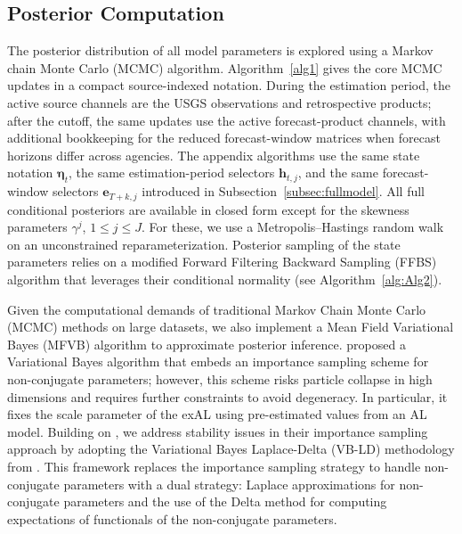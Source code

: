 \documentclass[APA,STIX1COL]{WileyNJD-v2}
\begin{document}
\subsection{Posterior Computation}
\label{subsec:postinf}
The posterior distribution of all model parameters is explored using a Markov chain Monte Carlo (MCMC) algorithm.
Algorithm~\ref{alg1} gives the core MCMC updates in a compact source-indexed notation. During the estimation period, the active source channels are the USGS observations and retrospective products; after the cutoff, the same updates use the active forecast-product channels, with additional bookkeeping for the reduced forecast-window matrices when forecast horizons differ across agencies. The appendix algorithms use the same state notation \(\boldsymbol{\eta}_t\), the same estimation-period selectors \(\mathbf{h}_{t,j}\), and the same forecast-window selectors \(\mathbf{e}_{T+k,j}\) introduced in Subsection~\ref{subsec:fullmodel}. All full conditional posteriors are available in closed form except for the skewness parameters $\gamma^j$, $1 \leq j \leq J$. For these, we use a Metropolis--Hastings random walk on an unconstrained reparameterization. Posterior sampling of the state parameters relies on a modified Forward Filtering Backward Sampling (FFBS) algorithm that leverages their conditional normality (see Algorithm~\ref{alg:Alg2}).


Given the computational demands of traditional Markov Chain Monte Carlo (MCMC) methods on large datasets, we also implement a Mean Field Variational Bayes (MFVB) algorithm to approximate posterior inference.
\citet{barata2021_flex_quantile} proposed a Variational Bayes algorithm that embeds an importance sampling scheme for non-conjugate parameters; however, this scheme risks particle collapse in high dimensions and requires further constraints to avoid degeneracy. In particular, it fixes the scale parameter of the exAL using pre-estimated values from an AL model. 
Building on \citet{barata2021_flex_quantile}, we address stability issues in their importance sampling approach by adopting the Variational Bayes Laplace-Delta (VB-LD) methodology from \citet{wang2013nonconjugatevb}. This framework replaces the importance sampling strategy to handle non-conjugate parameters with a dual strategy: Laplace approximations for non-conjugate parameters and the use of the Delta method for computing expectations of functionals of the non-conjugate parameters.
\end{document}
